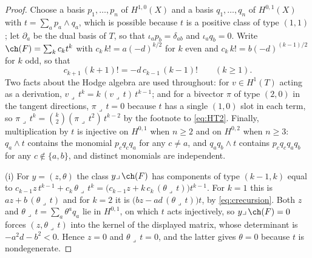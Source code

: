 \begin{proof}
Choose a basis $p_{1},\dots,p_{n}$ of $H^{1,0}(X)$ and a basis
$q_{1},\dots,q_{n}$ of $H^{0,1}(X)$ with $t=\sum_{a}p_{a}\wedge q_{a}$, which
is possible because $t$ is a positive class of type $(1,1)$; let
$\partial_{a}$ be the dual basis of $T$, so that $\iota_{a}p_{b}=\delta_{ab}$
and $\iota_{a}q_{b}=0$. Write $\ch(F)=\sum_{k}c_{k}t^{k}$ with
$c_{k}\,k!=a(-d)^{k/2}$ for $k$ even and $c_{k}\,k!=b(-d)^{(k-1)/2}$ for $k$
odd, so that
\begin{equation}\label{eq:crecursion}
  c_{k+1}\,(k+1)!=-d\,c_{k-1}\,(k-1)!\qquad(k\ge1).
\end{equation}
Two facts about the Hodge algebra are used throughout: for $v\in H^{1}(T)$
acting as a derivation, $v\lrcorner\,t^{k}=k\,(v\lrcorner\,t)\,t^{k-1}$; and
for a bivector $\pi$ of type $(2,0)$ in the tangent directions,
$\pi\lrcorner\,t=0$ because $t$ has a single $(1,0)$ slot in each term, so
$\pi\lrcorner\,t^{k}=\binom{k}{2}(\pi\lrcorner\,t^{2})\,t^{k-2}$ by the footnote
to \eqref{eq:HT2}. Finally, multiplication by $t$ is injective on $H^{0,1}$
when $n\ge2$ and on $H^{0,2}$ when $n\ge3$: $q_{a}\wedge t$ contains the
monomial $p_{c}q_{c}q_{a}$ for any $c\ne a$, and $q_{a}q_{b}\wedge t$ contains
$p_{c}q_{c}q_{a}q_{b}$ for any $c\notin\{a,b\}$, and distinct monomials are
independent.

(i) For $y=(z,\theta)$ the class $y\lrcorner\,\ch(F)$ has components of type
$(k-1,k)$ equal to $c_{k-1}z\,t^{k-1}+c_{k}\,\theta\lrcorner\,t^{k}
=\bigl(c_{k-1}z+k\,c_{k}\,(\theta\lrcorner\,t)\bigr)t^{k-1}$. For $k=1$ this
is $az+b\,(\theta\lrcorner\,t)$ and for $k=2$ it is
$\bigl(bz-ad\,(\theta\lrcorner\,t)\bigr)t$, by \eqref{eq:crecursion}. Both
$z$ and $\theta\lrcorner\,t=\sum_{a}\theta^{a}q_{a}$ lie in $H^{0,1}$, on which
$t$ acts injectively, so $y\lrcorner\,\ch(F)=0$ forces
$(z,\theta\lrcorner\,t)$ into the kernel of the displayed matrix, whose
determinant is $-a^{2}d-b^{2}<0$. Hence $z=0$ and $\theta\lrcorner\,t=0$, and
the latter gives $\theta=0$ because $t$ is nondegenerate.


\end{proof}
